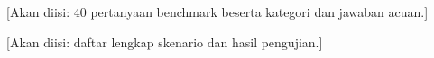 [Akan diisi: 40 pertanyaan benchmark beserta kategori dan jawaban acuan.]

[Akan diisi: daftar lengkap skenario dan hasil pengujian.]
